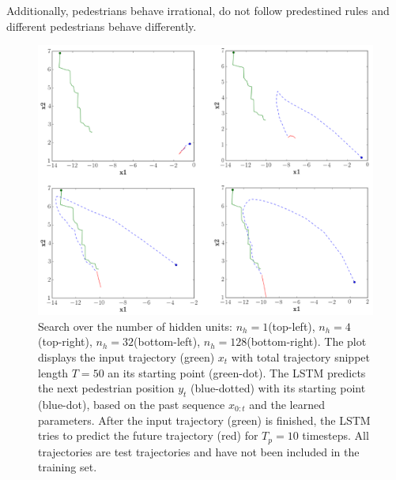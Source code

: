 Additionally, pedestrians behave irrational, do not follow predestined rules and different pedestrians behave differently. 

\begin{figure}
	\centering
	\includegraphics [trim=0 0 0 0, clip, angle=0, width=1.0\columnwidth,
	keepaspectratio]{figures/rnn_real_ped}
	\caption{Search over the number of hidden units: $n_h=1$(top-left), $n_h=4$(top-right), $n_h=32$(bottom-left), $n_h=128$(bottom-right). The plot displays the input trajectory (green) $x_t$ with total trajectory snippet length $T=50$ an its starting point (green-dot). The LSTM predicts the next pedestrian position $y_t$ (blue-dotted) with its starting point (blue-dot), based on the past sequence $x_{0:t}$ and the learned parameters. After the input trajectory (green) is finished, the LSTM tries to predict the future trajectory (red) for $T_p=10$ timesteps. All trajectories are test trajectories and have not been included in the training set.}
	\label{fig:rnn_real_ped}
\end{figure}

